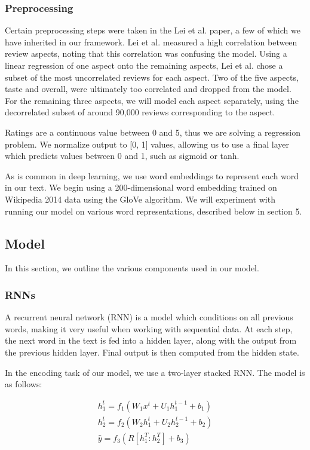 \documentclass{article} %
\begin{document}
\subsubsection{Preprocessing}

Certain preprocessing steps were taken in the Lei et al. paper, a few of which
we have inherited in our framework. Lei et al. measured a high correlation
between review aspects, noting that this correlation was confusing the model.
Using a linear regression of one aspect onto the remaining aspects, Lei et al.
chose a subset of the most uncorrelated reviews for each aspect. Two of the five
aspects, taste and overall, were ultimately too correlated and dropped from the
model. For the remaining three aspects, we will model each aspect separately,
using the decorrelated subset of around 90,000 reviews corresponding to the
aspect.

Ratings are a continuous value between 0 and 5, thus we are solving a regression
problem. We normalize output to [0, 1] values, allowing us to use a final layer
which predicts values between 0 and 1, such as sigmoid or tanh.

As is common in deep learning, we use word embeddings to represent each word in
our text. We begin using a 200-dimensional word embedding trained on Wikipedia
2014 data using the GloVe algorithm. We will experiment with running our model
on various word representations, described below in section 5.

\subsection{Model}

In this section, we outline the various components used in our model.

\subsubsection{RNNs}

A recurrent neural network (RNN) is a model which conditions on all previous
words, making it very useful when working with sequential data. At each step,
the next word in the text is fed into a hidden layer, along with the output from
the previous hidden layer. Final output is then computed from the hidden state.

In the encoding task of our model, we use a two-layer stacked RNN. The model is
as follows:

\begin{gather}
h_1^t = f_1(W_1 x^t + U_1 h_1^{t-1} + b_1) \\
h_2^t = f_2(W_2 h_1^t + U_2 h_2^{t-1} + b_2) \\
\hat{y} = f_3(R[h_1^T:h_2^T] + b_3)
\end{gather}
\end{document}

